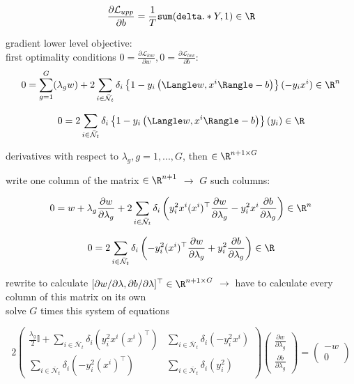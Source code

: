 	\[ \frac{\partial \mathcal{L}_{upp}}{\partial b} = \frac{1}{T}\texttt{sum}(\texttt{delta}.*Y ,1) \in \R\]
	
	
gradient lower level objective:\\
first optimality conditions \(0 = \frac{\partial \mathcal{L}_{low}}{\partial w}, 0 = \frac{\partial \mathcal{L}_{low}}{\partial b}\):
	\[ 0 = {\sum_{g = 1}^G(\lambda_g}w) + 2\sum_{i \in \bar{\mathcal{N}}_t}\delta_i \left\{1-y_i\left(\Langle w,x^i\Rangle -b\right) \right\}(-y_ix^i) \in \R^n \]
		
	\[0 = 2\sum_{i \in \bar{\mathcal{N}}_t}\delta_i \left\{1-y_i\left(\Langle w,x^i\Rangle -b\right) \right\}(y_i) \in \R \]
	
	derivatives with respect to \(\lambda_g, g = 1,...,G\), then \(\in \R^{n+1 \times G}\)
	
	write one column of the matrix \(\in \R^{n+1}\) \(\to\) \(G\) such columns:
	
	\[ 0 = w + \lambda_g\frac{\partial w}{\partial \lambda_g} + 2 \sum_{i \in  \bar{\mathcal{N}}_t} \delta_i \left(y_i^2x^i(x^i)^{\top}\frac{\partial w}{\partial \lambda_g} - y_i^2x^i \frac{\partial b}{\partial \lambda_g}\right) \in \R^n \]
	
	\[ 0 = 2\sum_{i \in  \bar{\mathcal{N}}_t} \delta_i \left(-y_i^2(x^i)^{\top} \frac{\partial w}{\partial \lambda_g} + y_i^2 \frac{\partial b}{\partial \lambda_g}\right) \in \R\] 


	rewrite to calculate \([\partial w / \partial \lambda, \partial b / \partial \lambda]^{\top} \in \R^{n+1 \times G}\) \(\to\) have to calculate every column of this matrix on its own \\
	solve \(G\) times this system of equations
	
	\[ 2\begin{pmatrix} \frac{\lambda_g}{2}\mathbb{I}+\sum_{i \in  \bar{\mathcal{N}}_t}{\delta_i(y_i^2x^i(x^i)^{\top})} &  \sum_{i \in  \bar{\mathcal{N}}_t} \delta_i (- y_i^2x^i )	\\
	\sum_{i \in  \bar{\mathcal{N}}_t} \delta_i (-y_i^2(x^i)^{\top}) & \sum_{i \in  \bar{\mathcal{N}}_t} \delta_i (y_i^2 )
	\end{pmatrix} 
	\begin{pmatrix}	\frac{\partial w}{\partial \lambda_g} \\ \frac{\partial b}{\partial \lambda_g}
	\end{pmatrix} 
	= \begin{pmatrix} -w \\ 0	\end{pmatrix} \]





